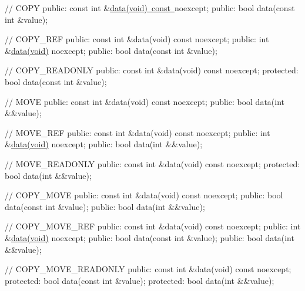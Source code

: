 // C\+O\+PY public\+: const int \&\mbox{\hyperlink{_m_p_m_c_queue_8ipp_abff670b1cad9d3a3050db076dc0f4365}{data(void) const }}noexcept; public\+: bool data(const int \&value);

// C\+O\+P\+Y\+\_\+\+R\+EF public\+: const int \&data(void) const noexcept; public\+: int \&\mbox{\hyperlink{_m_p_m_c_queue_8ipp_abff670b1cad9d3a3050db076dc0f4365}{data(void)}} noexcept; public\+: bool data(const int \&value);

// C\+O\+P\+Y\+\_\+\+R\+E\+A\+D\+O\+N\+LY public\+: const int \&data(void) const noexcept; protected\+: bool data(const int \&value);

// M\+O\+VE public\+: const int \&data(void) const noexcept; public\+: bool data(int \&\&value);

// M\+O\+V\+E\+\_\+\+R\+EF public\+: const int \&data(void) const noexcept; public\+: int \&\mbox{\hyperlink{_m_p_m_c_queue_8ipp_abff670b1cad9d3a3050db076dc0f4365}{data(void)}} noexcept; public\+: bool data(int \&\&value);

// M\+O\+V\+E\+\_\+\+R\+E\+A\+D\+O\+N\+LY public\+: const int \&data(void) const noexcept; protected\+: bool data(int \&\&value);

// C\+O\+P\+Y\+\_\+\+M\+O\+VE public\+: const int \&data(void) const noexcept; public\+: bool data(const int \&value); public\+: bool data(int \&\&value);

// C\+O\+P\+Y\+\_\+\+M\+O\+V\+E\+\_\+\+R\+EF public\+: const int \&data(void) const noexcept; public\+: int \&\mbox{\hyperlink{_m_p_m_c_queue_8ipp_abff670b1cad9d3a3050db076dc0f4365}{data(void)}} noexcept; public\+: bool data(const int \&value); public\+: bool data(int \&\&value);

// C\+O\+P\+Y\+\_\+\+M\+O\+V\+E\+\_\+\+R\+E\+A\+D\+O\+N\+LY public\+: const int \&data(void) const noexcept; protected\+: bool data(const int \&value); protected\+: bool data(int \&\&value); 